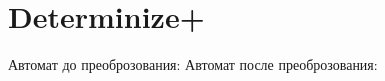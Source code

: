 \section{Determinize+}
\begin{frame}{}
	Автомат до преоброзования:
	Автомат после преоброзования:
\end{frame}

